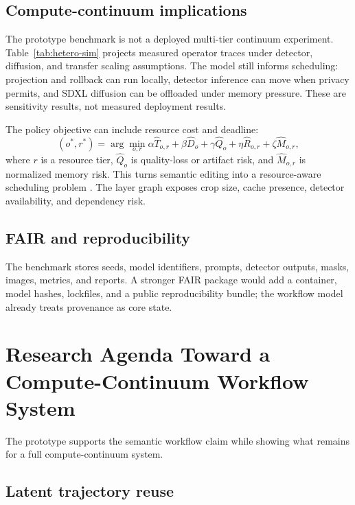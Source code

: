 \documentclass[final,5p,times,number,sort&compress]{elsarticle}
\begin{document}
\subsection{Compute-continuum implications}

The prototype benchmark is not a deployed multi-tier continuum experiment. Table~\ref{tab:hetero-sim} projects measured operator traces under detector, diffusion, and transfer scaling assumptions. The model still informs scheduling: projection and rollback can run locally, detector inference can move when privacy permits, and SDXL diffusion can be offloaded under memory pressure. These are sensitivity results, not measured deployment results.

The policy objective can include resource cost and deadline:
\begin{equation}
    (o^*,r^*) =
    \arg\min_{o,r}
    \alpha \widehat{T}_{o,r}
    + \beta \widehat{D}_o
    + \gamma \widehat{Q}_o
    + \eta \widehat{R}_{o,r}
    + \zeta \widehat{M}_{o,r},
\end{equation}
where \(r\) is a resource tier, \(\widehat{Q}_o\) is quality-loss or artifact risk, and \(\widehat{M}_{o,r}\) is normalized memory risk. This turns semantic editing into a resource-aware scheduling problem \citep{topcuoglu2002heft}. The layer graph exposes crop size, cache presence, detector availability, and dependency risk.

\subsection{FAIR and reproducibility}

The benchmark stores seeds, model identifiers, prompts, detector outputs, masks, images, metrics, and reports. A stronger FAIR package would add a container, model hashes, lockfiles, and a public reproducibility bundle; the workflow model already treats provenance as core state.

\section{Research Agenda Toward a Compute-Continuum Workflow System}

The prototype supports the semantic workflow claim while showing what remains for a full compute-continuum system.

\subsection{Latent trajectory reuse}
\end{document}

